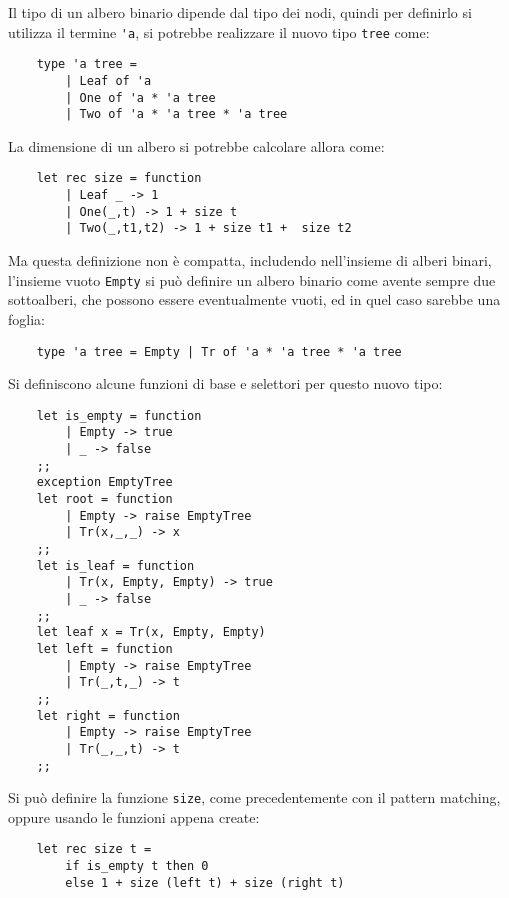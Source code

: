 \documentclass{article}
\numberwithin{equation}{subsection}
\begin{document}
Il tipo di un albero binario dipende dal tipo dei nodi, quindi per definirlo si utilizza il termine \verb|'a|, si potrebbe realizzare il nuovo tipo \verb|tree| come:
\begin{verbatim}
    type 'a tree = 
        | Leaf of 'a
        | One of 'a * 'a tree
        | Two of 'a * 'a tree * 'a tree
\end{verbatim}
La dimensione di un albero si potrebbe calcolare allora come:
\begin{verbatim}
    let rec size = function
        | Leaf _ -> 1
        | One(_,t) -> 1 + size t
        | Two(_,t1,t2) -> 1 + size t1 +  size t2    
\end{verbatim}
Ma questa definizione non è compatta, includendo nell'insieme di alberi binari, l'insieme vuoto \verb|Empty| si può definire un albero binario come avente sempre due sottoalberi, che possono essere eventualmente vuoti, ed in quel caso sarebbe una foglia:
\begin{verbatim}
    type 'a tree = Empty | Tr of 'a * 'a tree * 'a tree
\end{verbatim}
Si definiscono alcune funzioni di base e selettori per questo nuovo tipo:
\begin{verbatim}
    let is_empty = function
        | Empty -> true
        | _ -> false
    ;;
    exception EmptyTree
    let root = function
        | Empty -> raise EmptyTree
        | Tr(x,_,_) -> x
    ;;
    let is_leaf = function
        | Tr(x, Empty, Empty) -> true
        | _ -> false
    ;;
    let leaf x = Tr(x, Empty, Empty)
    let left = function
        | Empty -> raise EmptyTree
        | Tr(_,t,_) -> t
    ;;
    let right = function
        | Empty -> raise EmptyTree
        | Tr(_,_,t) -> t
    ;;
\end{verbatim}
Si può definire la funzione \verb|size|, come precedentemente con il pattern matching, oppure usando le funzioni appena create:
\begin{verbatim}
    let rec size t =
        if is_empty t then 0
        else 1 + size (left t) + size (right t)
\end{verbatim}
\end{document}
